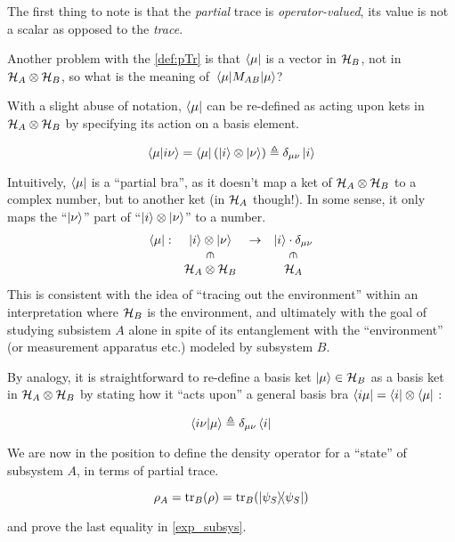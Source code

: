 The first thing to note is that the \emph{partial} trace is \emph{operator-valued},
its value is not a scalar as opposed to the \emph{trace}.

Another problem with the \ref{def:pTr} is that $\bra{\mu}$
is a vector in $\mathcal{H}_B$, not in $\mathcal{H}_A\otimes\mathcal{H}_B$,
so what is the meaning of $\matrixel{\mu}{M_{AB}}{\mu}$?

With a slight abuse of notation,
$\bra{\mu}$ can be re-defined as acting upon kets in
$\mathcal{H}_A\otimes\mathcal{H}_B$ by specifying its action on a basis element.

\begin{definition}\label{def:pBra}
\[
  \braket{\mu}{i\nu} = \bra{\mu}\left(\ket{i}\otimes\ket{\nu}\right) \triangleq \delta_{\mu\nu}\ket{i}
\]
\end{definition}

Intuitively, $\bra{\mu}$ is a ``partial bra'', as it doesn't map a ket
of $\mathcal{H}_A\otimes\mathcal{H}_B$ to
a complex number, but to another ket (in $\mathcal{H}_A$ though!).
In some sense, it only maps the ``$\ket{\nu}$'' part of
``$\ket{i}\otimes\ket{\nu}$''
to a number.
\[
  \begin{array}{cccc}
    \bra{\mu}:  & \ket{i}\ox\ket{\nu}                   & \rightarrow & \ket{i}\cdot\delta_{\mu\nu}           \\
                & \rotatebox[origin=c]{270}{$\in$}      &             & \rotatebox[origin=c]{270}{$\in$}      \\
                & \hilb{H}_A\ox\hilb{H}_B               &             & \hilb{H}_A
  \end{array}
\]
This is consistent with the idea of
``tracing out the environment'' \parencite{Nakahara} within an interpretation where
$\mathcal{H}_B$ is the environment, and ultimately with the goal of
studying subsistem $A$ alone in spite of its entanglement with the 
``environment'' (or measurement apparatus etc.) modeled by
subsystem $B$.

By analogy, it is straightforward to re-define a basis ket $\ket{\mu} \in \mathcal{H}_B$
as a basis ket in $\mathcal{H}_A \otimes \mathcal{H}_B$ by stating how it ``acts upon''
a general basis bra $\bra{i\mu} = \bra{i}\otimes\bra{\mu}$ :
\begin{definition}\label{def:pKet}
  \[
    \braket{i\nu}{\mu} \triangleq \delta_{\mu\nu}\bra{i}
  \]
\end{definition}

We are now in the position to define the density operator for a ``state''
of subsystem $A$, in terms of partial trace.
\begin{definition}\label{def:density_A}
  \[
    \rho_A = \tr_B(\rho) = \tr_B(\ketbra{\psi_S}{\psi_S})
  \]
\end{definition}
and prove the last equality in \eqref{exp_subsys}.

